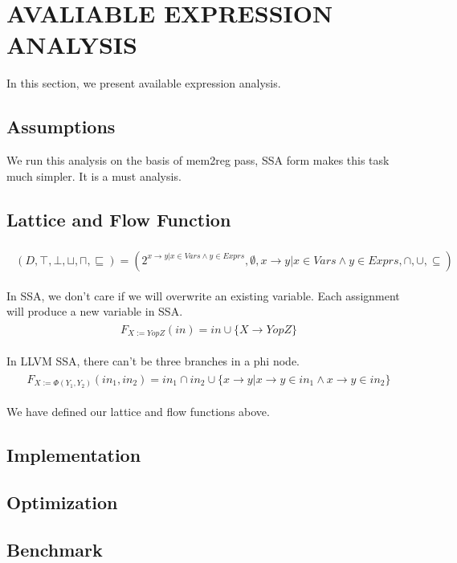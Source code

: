 \section{AVALIABLE EXPRESSION ANALYSIS}
In this section, we present available expression analysis.

\subsection{Assumptions}
We run this analysis on the basis of mem2reg pass, SSA form makes this task much simpler. It is a must analysis.

\subsection{Lattice and Flow Function}

\begin{align} 
	\begin{split}
		(D, \top, \bot, \sqcup, \sqcap, \sqsubseteq) = (2^{x \to y | x \in Vars \wedge y \in Exprs}, \emptyset, x \to y | x \in Vars \wedge y \in Exprs, \cap, \cup, \subseteq)
	\end{split}
\end{align}

In SSA, we don't care if we will overwrite an existing variable. Each assignment will produce a new variable in SSA.
\begin{align} 
	\begin{split}
		F_{X := Y op Z}(in) = in  \cup \{ X \to Y op Z \}
	\end{split}
\end{align}

In LLVM SSA, there can't be three branches in a phi node.
\begin{align} 
	\begin{split}
		F_{X := \Phi(Y_1, Y_2)}(in_1, in_2) = in_1 \cap in_2  \cup \{x \to y | x \to y \in in_1 \wedge x \to y \in in_2\}
	\end{split}
\end{align}

We have defined our lattice and flow functions above.

\subsection{Implementation}


\subsection{Optimization}


\subsection{Benchmark}
